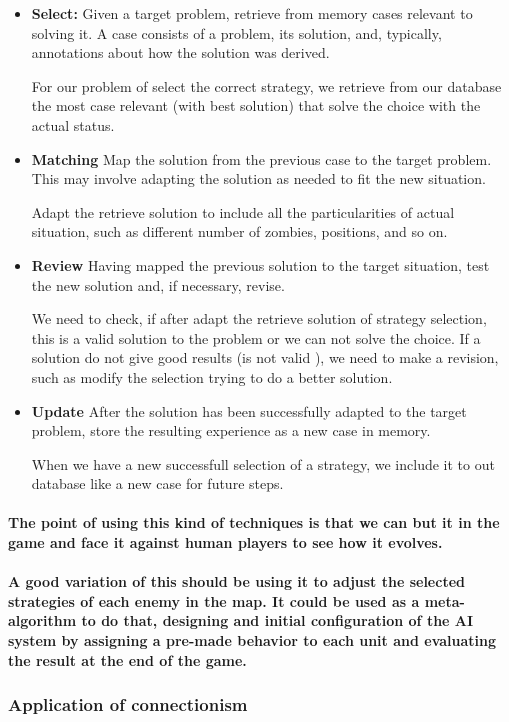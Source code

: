 \documentclass[a4paper,10pt]{article}
\newcommand{\p}[1]{\paragraph{\indent\textnormal{#1}}}
\begin{document}
      \begin{itemize}
	\item \textbf{Select:} Given a target problem, retrieve from memory cases relevant to solving it. A case consists of a problem, its solution, and, typically, annotations about how the solution was derived. 

	For our problem of select the correct strategy, we retrieve from our database the most case relevant (with best solution) that solve the choice with the actual status.

	\item \textbf{Matching} Map the solution from the previous case to the target problem. This may involve adapting the solution as needed to fit the new situation.

	Adapt the retrieve solution to include all the particularities of actual situation, such as different number of zombies, positions, and so on.

	\item \textbf{Review} Having mapped the previous solution to the target situation, test the new solution and, if necessary, revise. 

	We need to check, if after adapt the retrieve solution of strategy selection, this is a valid solution to the problem or we can not solve the choice. If a solution do not give good results (is not valid ), we need to make a revision, such as modify the selection trying to do a better solution.

	\item \textbf{Update} After the solution has been successfully adapted to the target problem, store the resulting experience as a new case in memory.

	When we have a new successfull selection of a strategy, we include it to out database like a new case for future steps.

      \end{itemize}

    \p{The point of using this kind of techniques is that we can but it in the game and face it against human players to see how it evolves.}

     \p{A good variation of this should be using it to adjust the selected strategies of each enemy in the map. It could be used as a \textbf{meta-algorithm} to do that, designing and initial configuration of the AI system by assigning a pre-made behavior to each unit and evaluating the result at the end of the game.}

  \subsubsection{Application of connectionism}
\end{document}
